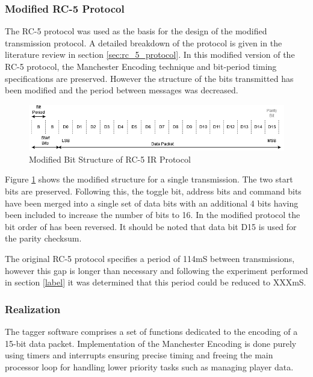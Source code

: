 \subsubsection{Modified RC-5 Protocol}
The RC-5 protocol was used as the basis for the design of the modified transmission protocol. A detailed breakdown of the protocol is given in the literature review in section \ref{sec:rc_5_protocol}. In this modified version of the RC-5 protocol, the Manchester Encoding technique and bit-period timing specifications are preserved. However the structure of the bits transmitted has been modified and the period between messages was decreased.

\begin{figure}[H]
	\centering
	\includegraphics[width=0.8\linewidth]{figures/design/modified_rc5_protocol.png}
	\caption{Modified Bit Structure of RC-5 IR Protocol}
	\label{fig:modified_rc_5_protocol}
\end{figure}

Figure \ref{fig:modified_rc_5_protocol} shows the modified structure for a single transmission. The two start bits are preserved. Following this, the toggle bit, address bits and command bits have been merged into a single set of data bits with an additional 4 bits having been included to increase the number of bits to 16. In the modified protocol the bit order of has been reversed. It should be noted that data bit D15 is used for the parity checksum.

The original RC-5 protocol specifies a period of 114mS between transmissions, however this gap is longer than necessary and following the experiment performed in section \ref{label} it was determined that this period could be reduced to XXXmS.

\subsubsection{Realization}

The tagger software comprises a set of functions dedicated to the encoding of a 15-bit data packet. Implementation of the Manchester Encoding is done purely using timers and interrupts ensuring precise timing and freeing the main processor loop for handling lower priority tasks such as managing player data.

